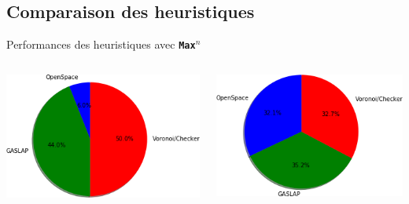     \subsection*{Comparaison des heuristiques}
    \begin{frame}{Performances des heuristiques avec \textbf{\texttt{Max$^n$}}}
        \begin{columns}
            \begin{column}{0.5\textwidth}
                \includegraphics[scale=0.5]{Images/ProporitionVictoireHeuristiqueWithMaxN.png}
            \end{column}
            \begin{column}{0.5\textwidth}
                \includegraphics[scale=0.5]{Images/ProportionDureePartieGagnanteWithMaxN.png}
            \end{column}
        \end{columns}
    \end{frame}

